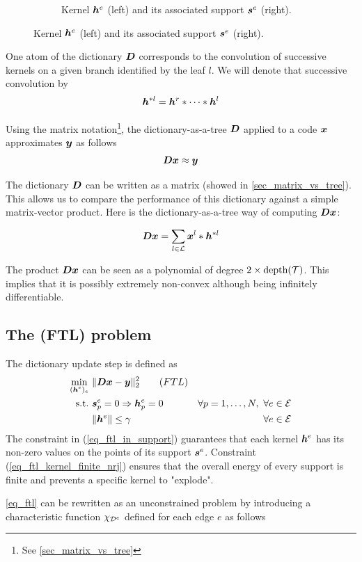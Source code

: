 \begin{figure}[!ht]
\begin{subfigure}[b]{0.79\textwidth}
\caption{Kernel $\bm{h}^e$ (left) and its associated support $\bm{s}^e$ (right).}\label{fig_example_kernel}
\end{subfigure}
\end{figure}

One atom of the dictionary $\bm{D}$ corresponds to the convolution of successive kernels on a given branch identified by the leaf $l$. We will denote that successive convolution by
$$\bm{h}^{*l} = \bm{h}^r * \dots * \bm{h}^l$$

Using the matrix notation\footnote{See \cref{sec_matrix_vs_tree}}, the dictionary-as-a-tree $\bm{D}$ applied to a code $\bm{x}$ approximates $\bm{y}$ as follows
$$\bm{D}\bm{x} \approx \bm{y}$$

The dictionary $\bm{D}$ can be written as a matrix (showed in \cref{sec_matrix_vs_tree}). This allows us to compare the performance of this dictionary against a simple matrix-vector product. Here is the dictionary-as-a-tree way of computing $\bm{D}\bm{x}$:

\begin{align}
	\bm{D}\bm{x} = \sum_{l \in \mathcal L} \bm{x}^l * \bm{h}^{*l}	 \label{eq_Dx_as_convolution}
\end{align}

The product $\bm{D}\bm{x}$ can be seen as a polynomial of degree $2 \times \text{depth}(\mathcal T)$. This implies that it is possibly extremely non-convex although being infinitely differentiable.

\subsection{The (FTL) problem}

The dictionary update step is defined as
\begin{align}
\underset{\substack{(\bm{h}^e)_{e}}}\min ~ & \lVert \bm{D}\bm{x} - \bm{y} \rVert_2^2 \tag{$FTL$} \label{eq_ftl}\\
\text{s.t.~} & \bm{s}^e_p=0 \Rightarrow \bm{h}^e_p = 0 \quad & \forall p=1,\dots,N ,~\forall e \in \mathcal E \label{eq_ftl_in_support} \\
 & \lVert \bm{h}^e \rVert \le \gamma & \forall e \in \mathcal E\label{eq_ftl_kernel_finite_nrj}
\end{align} The constraint in (\ref{eq_ftl_in_support}) guarantees that each kernel $\bm{h}^e$ has its non-zero values on the points of its support $\bm{s}^e$. Constraint (\ref{eq_ftl_kernel_finite_nrj}) ensures that the overall energy of every support is finite and prevents a specific kernel to "explode".

\eqref{eq_ftl} can be rewritten as an unconstrained problem by introducing a characteristic function $\chi_{{\mathcal D}^e}$ defined for each edge $e$ as follows

